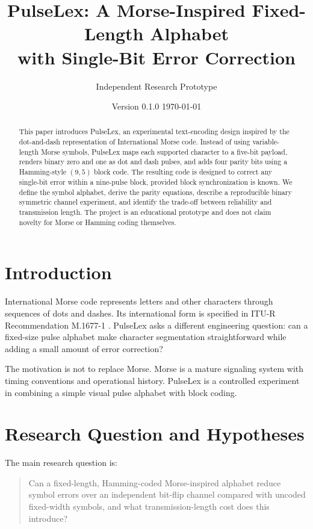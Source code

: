 \documentclass[11pt,a4paper]{article}
\title{\textbf{PulseLex: A Morse-Inspired Fixed-Length Alphabet\\
with Single-Bit Error Correction}}
\author{Independent Research Prototype}
\date{Version 0.1.0 \quad \today}
\begin{document}
\maketitle

\begin{abstract}
This paper introduces PulseLex, an experimental text-encoding design inspired
by the dot-and-dash representation of International Morse code. Instead of
using variable-length Morse symbols, PulseLex maps each supported character
to a five-bit payload, renders binary zero and one as dot and dash pulses, and
adds four parity bits using a Hamming-style $(9,5)$ block code. The resulting
code is designed to correct any single-bit error within a nine-pulse block,
provided block synchronization is known. We define the symbol alphabet,
derive the parity equations, describe a reproducible binary symmetric channel
experiment, and identify the trade-off between reliability and transmission
length. The project is an educational prototype and does not claim novelty
for Morse or Hamming coding themselves.
\end{abstract}

\section{Introduction}
International Morse code represents letters and other characters through
sequences of dots and dashes. Its international form is specified in
ITU-R Recommendation M.1677-1 \cite{itu2009morse}. PulseLex asks a different
engineering question: can a fixed-size pulse alphabet make character
segmentation straightforward while adding a small amount of error correction?

The motivation is not to replace Morse. Morse is a mature signaling system
with timing conventions and operational history. PulseLex is a controlled
experiment in combining a simple visual pulse alphabet with block coding.

\section{Research Question and Hypotheses}
The main research question is:

\begin{quote}
Can a fixed-length, Hamming-coded Morse-inspired alphabet reduce symbol
errors over an independent bit-flip channel compared with uncoded fixed-width
symbols, and what transmission-length cost does this introduce?
\end{quote}
\end{document}
